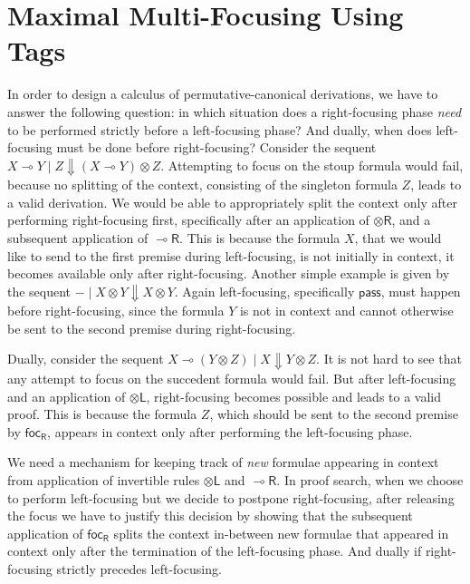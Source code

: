 \documentclass[runningheads]{llncs}
\newcommand{\tl}{\otimes \mathsf{L}}
\newcommand{\tr}{\otimes \mathsf{R}}
\newcommand{\lright}{{\multimap}\mathsf{R}}
\newcommand{\pass}{\mathsf{pass}}
\newcommand{\otL}{\tl}
\newcommand{\otR}{\tr}
\newcommand{\lolliR}{\lright}
\newcommand{\ot}{\otimes}
\newcommand{\lolli}{\multimap}
\newcommand{\dn}{\Downarrow}
\newcommand{\focR}{\mathsf{foc_R}}
\begin{document}
\section{Maximal Multi-Focusing Using Tags}\label{sec:maxfocus}

In order to design a calculus of permutative-canonical derivations, we have to answer the following question: in which situation does a right-focusing phase \emph{need} to be performed strictly before a left-focusing phase? And dually, when does left-focusing must be done before right-focusing? 
Consider the sequent $X \lolli Y \mid Z \dn (X \lolli Y) \ot Z$. Attempting to focus on the stoup formula would fail, because no splitting of the context, consisting of the singleton formula $Z$, leads to a valid derivation. We would be able to appropriately split the context only after performing right-focusing first, specifically after an application of $\otR$, and a subsequent application of $\lolliR$. This is because the formula  $X$, that we would like to send to the first premise during left-focusing, is not initially in context, it becomes available only after right-focusing. Another simple example is given by the sequent $- \mid X \ot Y \dn X \ot Y$. Again left-focusing, specifically $\pass$, must happen before right-focusing, since the formula $Y$ is not in context and cannot otherwise be sent to the second premise during right-focusing.

Dually, consider the sequent $X \lolli (Y \ot Z) \mid X \dn Y \ot Z$. It is not hard to see that any attempt to focus on the succedent formula would fail. But after left-focusing and an application of $\otL$, right-focusing becomes possible and leads to a valid proof. This is because the formula $Z$, which should be sent to the second premise by $\focR$, appears in context only after performing the left-focusing phase.

We need a mechanism for keeping track of \emph{new} formulae appearing in context from application of invertible rules $\otL$ and $\lolliR$. In proof search, when we choose to perform left-focusing but we decide to postpone right-focusing, after releasing the focus we have to justify this decision by showing that the subsequent application of $\focR$ splits the context in-between new formulae that appeared in context only after the termination of the left-focusing phase. And dually if right-focusing strictly precedes left-focusing.
\end{document}
